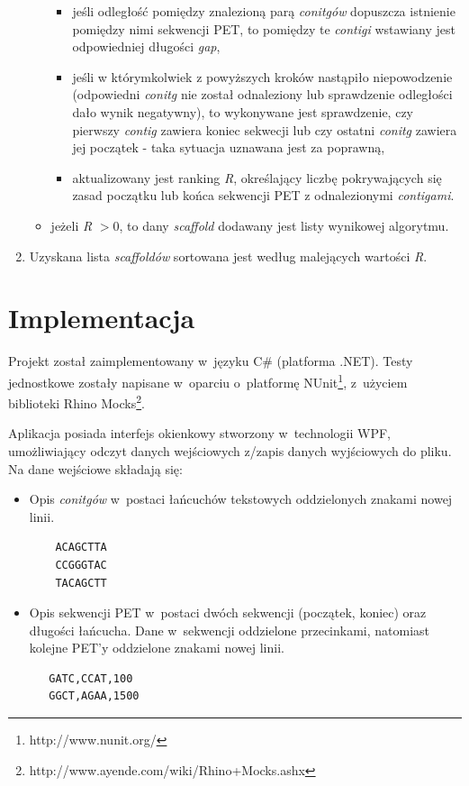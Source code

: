 \documentclass[a4paper,10pt]{article}
\begin{document}
\begin{enumerate}
\begin{itemize}
\begin{itemize}
     \item jeśli odległość pomiędzy znalezioną parą \emph{conitgów} dopuszcza istnienie pomiędzy nimi sekwencji PET, to  pomiędzy te \emph{contigi} wstawiany jest odpowiedniej długości \emph{gap},
     \item jeśli w którymkolwiek z powyższych kroków nastąpiło niepowodzenie (odpowiedni \emph{conitg} nie został odnaleziony lub sprawdzenie odległości dało wynik negatywny), to wykonywane jest sprawdzenie, czy pierwszy \emph{contig} zawiera koniec sekwecji lub czy ostatni \emph{conitg} zawiera jej  początek - taka sytuacja uznawana jest za poprawną,
     \item aktualizowany jest ranking \emph{R}, określający liczbę pokrywających się zasad początku lub końca sekwencji PET z odnalezionymi \emph{contigami}.
    \end{itemize}
   \item jeżeli \emph{R} $> 0$, to dany \emph{scaffold} dodawany jest listy wynikowej algorytmu.
  \end{itemize}
 \item Uzyskana lista \emph{scaffoldów} sortowana jest według malejących wartości \emph{R}.
\end{enumerate}

\section*{Implementacja}

Projekt został zaimplementowany w~języku C\# (platforma .NET). Testy jednostkowe zostały napisane w~oparciu o~platformę NUnit\footnote{http://www.nunit.org/}, z~użyciem biblioteki Rhino Mocks\footnote{http://www.ayende.com/wiki/Rhino+Mocks.ashx}.

Aplikacja posiada interfejs okienkowy stworzony w~technologii WPF, umożliwiający odczyt danych wejściowych z/zapis danych wyjściowych do pliku. Na dane wejściowe składają się:

\begin{itemize}
 \item Opis \emph{conitgów} w~postaci łańcuchów tekstowych oddzielonych znakami nowej linii.
 
  \begin{verbatim}
    ACAGCTTA
    CCGGGTAC
    TACAGCTT
  \end{verbatim}
  \item Opis sekwencji PET w~postaci dwóch sekwencji (początek, koniec) oraz długości łańcucha. Dane w~sekwencji oddzielone przecinkami, natomiast kolejne PET'y oddzielone znakami nowej linii.
  
  \begin{verbatim}
   GATC,CCAT,100
   GGCT,AGAA,1500
  \end{verbatim}
\end{itemize}
\end{document}
